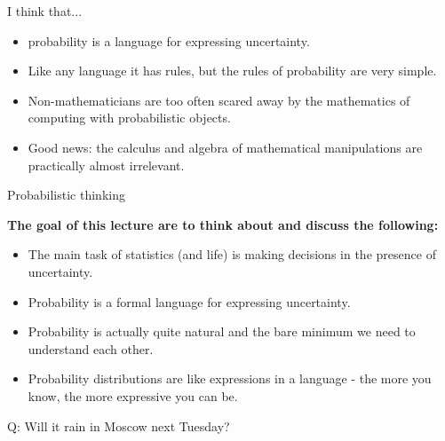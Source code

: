 \begin{frame}{I think that...}

\begin{Large}
\begin{itemize}
\item probability is a language for expressing uncertainty.
\item Like any language it has rules, but the rules of probability are very simple.
\item Non-mathematicians are too often scared away by the mathematics of computing with probabilistic objects.
\item Good news: the calculus and algebra of mathematical manipulations are practically almost irrelevant.
\end{itemize}
\end{Large}
\end{frame}


\begin{frame}{Probabilistic thinking}

\bigskip

\textbf{The goal of this lecture are to think about and discuss the following:}

\bigskip
\begin{itemize}\itemsep1.2em

\item The main task of statistics (and life) is making decisions in the presence of uncertainty.

\item Probability is a formal language for expressing uncertainty.

\item Probability is actually quite natural and the bare minimum we need to understand each other.

\item Probability distributions are like expressions in a language - the more you know, the more expressive you can be.

\end{itemize}

\bigskip

\end{frame}


\begin{frame}{}
\centering

\bigskip

\bigskip

\smallskip

\begin{LARGE}
{\color{red} Q:} Will it rain in Moscow next Tuesday?
\end{LARGE}

\end{frame}



